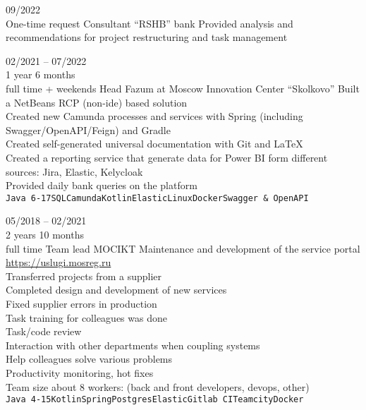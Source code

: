 


\begin{entrylist}
    \entry
    {09/2022\\\footnotesize{One-time request}}
    {Consultant}
    {\enquote{RSHB} bank}
    {
        Provided analysis and recommendations for project restructuring and task management
    }

    \entry
    {02/2021 -- 07/2022\\\footnotesize{1 year 6 months\\full time + weekends}}
    {Head}
    {Fazum at Moscow Innovation Center \enquote{Skolkovo}}
    {
        Built a NetBeans RCP (non-ide) based solution \\
    Created new Camunda processes and services with Spring (including Swagger/OpenAPI/Feign) and Gradle \\
    Created self-generated universal documentation with Git and LaTeX \\
    Created a reporting service that generate data for Power BI form different sources: Jira, Elastic, Kelycloak \\
    Provided daily bank queries on the platform \\
    \texttt{Java 6-17}\slashsep\texttt{SQL}\slashsep\texttt{Camunda}\slashsep\texttt{Kotlin}\slashsep\texttt{Elastic}\slashsep\texttt{Linux}\slashsep\texttt{Docker}\slashsep\texttt{Swagger \& OpenAPI}
    }

    \entry
    {05/2018 -- 02/2021\\\footnotesize{2 years 10 months\\full time}}
    {Team lead}
    {MOCIKT}
    {
        Maintenance and development of the service portal \url{https://uslugi.mosreg.ru} \\
        Transferred projects from a supplier \\
        Completed design and development of new services \\
        Fixed supplier errors in production \\
        Task training for colleagues was done \\
        Task/code review \\
        Interaction with other departments when coupling systems \\
        Help colleagues solve various problems \\
        Productivity monitoring, hot fixes \\
    Team size about 8 workers: (back and front developers, devops, other) \\
    \texttt{Java 4-15}\slashsep\texttt{Kotlin}\slashsep\texttt{Spring}\slashsep\texttt{Postgres}\slashsep\texttt{Elastic}\slashsep\texttt{Gitlab CI}\slashsep\texttt{Teamcity}\slashsep\texttt{Docker}
	}


\end{entrylist}
